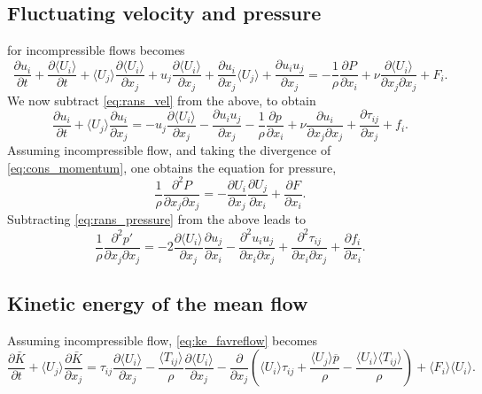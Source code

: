 \documentclass[oneside,a4paper,11pt]{report}
\newcommand{\pavg}{\overline{p}}
\newcommand{\pfluc}{p'}
\newcommand{\rs}{\tau}          %
\newcommand{\uiavg}{\langle U_i \rangle}
\newcommand{\ujavg}{\langle U_j \rangle}
\newcommand{\uifluc}{u_i}
\newcommand{\ujfluc}{u_j}
\begin{document}
\subsection{Fluctuating velocity and pressure}
 for incompressible flows becomes
\begin{equation}
    \frac{\partial \uifluc}{\partial t} + \frac{\partial \uiavg}{\partial t} + \ujavg \frac{\partial \uiavg}{\partial x_j} + \ujfluc \frac{\partial \uiavg}{\partial x_j} + \frac{\partial \uifluc}{\partial x_j} \ujavg + \frac{\partial \uifluc \ujfluc}{\partial x_j} = -\frac{1}{\rho}\frac{\partial P}{\partial x_i} + \nu \frac{\partial \uiavg}{\partial x_j \partial x_j} + F_i.
\end{equation}
We now subtract \cref{eq:rans_vel} from the above, to obtain
\begin{equation}
\label{eq:vel_fluc}
    \frac{\partial \uifluc}{\partial t} + \ujavg \frac{\partial \uifluc}{\partial x_j} = -\ujfluc \frac{\partial \uiavg}{\partial x_j} - \frac{\partial \uifluc \ujfluc}{\partial x_j} - \frac{1}{\rho}\frac{\partial p}{\partial x_i} + \nu \frac{\partial \uifluc}{\partial x_j \partial x_j} + \frac{\partial \tau_{ij}}{\partial x_j} + f_i.
\end{equation}
Assuming incompressible flow, and taking the divergence of \cref{eq:cons_momentum}, one obtains the equation for pressure,
\begin{equation}
\frac{1}{\rho} \frac{\partial^2 P}{\partial x_j \partial x_j} = -\frac{\partial U_i}{\partial x_j}\frac{\partial U_j}{\partial x_i} + \frac{\partial F}{\partial x_i}.
\end{equation}
Subtracting \cref{eq:rans_pressure} from the above leads to
\begin{equation}
\label{press_fluc}
\frac{1}{\rho} \frac{\partial^2 \pfluc}{\partial x_j \partial x_j} = -2 \frac{\partial \uiavg}{\partial x_j} \frac{\partial \ujfluc}{\partial x_i} - \frac{\partial^2 \uifluc \ujfluc}{\partial x_i \partial x_j} + \frac{\partial^2 \rs_{ij}}{\partial x_i \partial x_j} + \frac{\partial f_i}{\partial x_i}.
\end{equation}

\subsection{Kinetic energy of the mean flow}
Assuming incompressible flow, \cref{eq:ke_favreflow} becomes
\begin{equation}
\label{eq:ke_ransflow}
\frac{\partial \bar{K} }{\partial t} + \ujavg \frac{ \partial \bar{K} }{\partial x_j} = \rs_{ij} \frac{\partial \uiavg}{\partial x_j} - \frac{ \langle T_{ij} \rangle }{ \rho } \frac{ \partial \uiavg }{\partial x_j} -  \frac{\partial}{\partial x_j} \left ( \uiavg \rs_{ij} + \frac{ \ujavg \pavg }{\rho} - \frac{ \uiavg \langle T_{ij} \rangle }{\rho} \right ) + \langle F_i \rangle \uiavg.
\end{equation}
\end{document}

